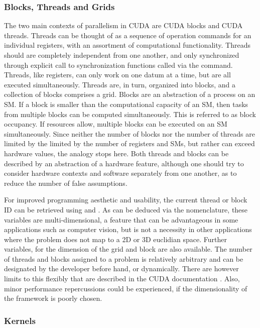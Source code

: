 \subsubsection{Blocks, Threads and Grids}\label{btg}
The two main contexts of parallelism in CUDA are CUDA blocks and CUDA threads.
Threads can be thought of as a sequence of operation commands for an individual
registers, with an assortment of computational functionality.  Threads should
are completely independent from one another, and only synchronized through
explicit call to synchronization functions called via the 
command. Threads, like registers, can only work on one datum at a time, but are all executed simultaneously.
Threads are, in turn, organized into blocks, and a collection of blocks comprises a grid.
Blocks are an abstraction of a process on an SM.  If a block is smaller than
the computational capacity of an SM, then tasks from multiple blocks can be computed
simultaneously.  This is referred to as block occupancy.  If resources allow, multiple blocks can
be executed on an \Gls{SM} simultaneously. Since neither the number of blocks nor the
number of threads are limited by the limited by the number of registers and \Glspl{SM},
but rather can exceed hardware values, the analogy stops here.  Both
threads and blocks can be described by an abstraction of a hardware feature, although one should try to
consider hardware contexts and software separately from one another, as to reduce the number
of false assumptions.
\par
For improved programming aesthetic and usability, the current thread or block ID can be retrieved using
 and . As can be deduced via the nomenclature,
these variables are multi-dimensional, a feature that can be advantageous in some
applications such as computer vision, but is not a necessity in other applications
where the problem does not map to a 2D or 3D euclidian space. Further variables,
for the dimension of the grid and block are also available. %
The number of threads and blocks assigned to a problem is relatively arbitrary and can
be designated by the developer before hand, or dynamically.  There are however limits
to this flexibly that are described in the CUDA documentation \cite{bestpractices}.
  Also, minor performance
repercussions could be experienced, if the dimensionality of the framework is poorly
chosen.
\subsubsection{Kernels}

